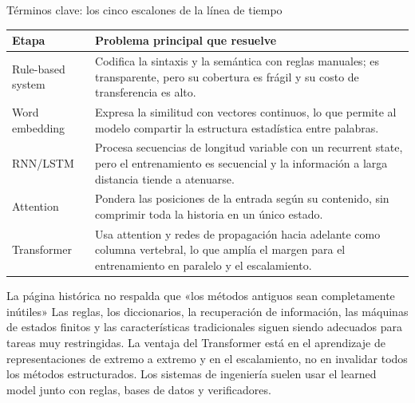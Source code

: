
\begin{knowledgebox}{Términos clave: los cinco escalones de la línea de tiempo}
\begin{tabularx}{\textwidth}{L{0.19\textwidth} X}
\toprule
Etapa & Problema principal que resuelve \\
\midrule
Rule-based system & Codifica la sintaxis y la semántica con reglas manuales; es transparente, pero su cobertura es frágil y su costo de transferencia es alto. \\
Word embedding & Expresa la similitud con vectores continuos, lo que permite al modelo compartir la estructura estadística entre palabras. \\
RNN/LSTM & Procesa secuencias de longitud variable con un recurrent state, pero el entrenamiento es secuencial y la información a larga distancia tiende a atenuarse. \\
Attention & Pondera las posiciones de la entrada según su contenido, sin comprimir toda la historia en un único estado. \\
Transformer & Usa attention y redes de propagación hacia adelante como columna vertebral, lo que amplía el margen para el entrenamiento en paralelo y el escalamiento. \\
\bottomrule
\end{tabularx}
\end{knowledgebox}


\begin{warningbox}{La página histórica no respalda que «los métodos antiguos sean completamente inútiles»}
Las reglas, los diccionarios, la recuperación de información, las máquinas de estados finitos y las características tradicionales siguen siendo adecuados para tareas muy restringidas. La ventaja del Transformer está en el aprendizaje de representaciones de extremo a extremo y en el escalamiento, no en invalidar todos los métodos estructurados. Los sistemas de ingeniería suelen usar el learned model junto con reglas, bases de datos y verificadores.
\end{warningbox}


